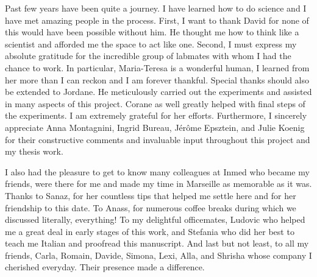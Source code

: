 Past few years have been quite a journey.
I have learned how to do science and I have met amazing people in the process.
First, I want to thank David for none of this would have been possible without him.
He thought me how to think like a scientist and afforded me the space to act like one.
Second, I must express my absolute gratitude for the incredible group of labmates with whom I had the chance to work.
In particular, Maria-Teresa is a wonderful human, I learned from her more than I can reckon and I am forever thankful.
Special thanks should also be extended to Jordane.
He meticulously carried out the experiments and assisted in many aspects of this project.
Corane as well greatly helped with final steps of the experiments.
I am extremely grateful for her efforts.
Furthermore, I sincerely appreciate Anna Montagnini, Ingrid Bureau, J\'{e}r\^{o}me Epsztein, and Julie Koenig for their constructive comments and invaluable input throughout this project and my thesis work.
\par
I also had the pleasure to get to know many colleagues at Inmed who became my friends, were there for me and made my time in Marseille as memorable as it was.
Thanks to Sanaz, for her countless tips that helped me settle here and for her friendship to this date.
To Anass, for numerous coffee breaks during which we discussed literally, everything!
To my delightful officemates, Ludovic who helped me a great deal in early stages of this work, and Stefania who did her best to teach me Italian and proofread this manuscript.
And last but not least, to all my friends, Carla, Romain, Davide, Simona, Lexi, Alla, and Shrisha whose company I cherished everyday.
Their presence made a difference.